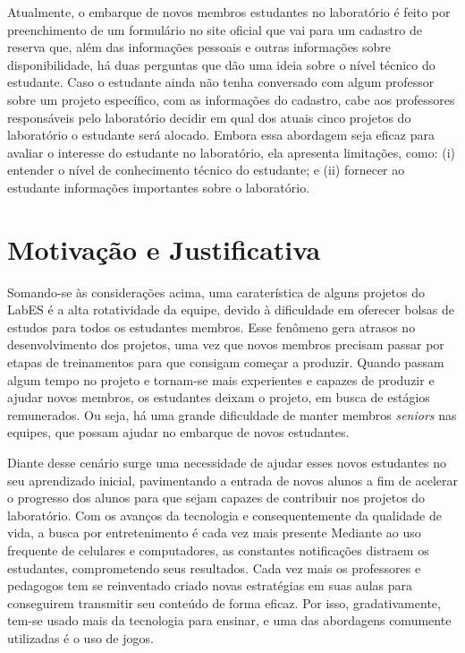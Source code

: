 Atualmente, o embarque de novos membros estudantes no laboratório é feito por preenchimento de um formulário no site oficial que vai para um cadastro de reserva que, além das informações pessoais e outras informações sobre disponibilidade, há duas perguntas que dão uma ideia sobre o nível técnico do estudante. Caso o estudante ainda não tenha conversado com algum professor sobre um projeto específico, com as informações do cadastro, cabe aos professores responsáveis pelo laboratório decidir em qual dos atuais cinco projetos do laboratório o estudante será alocado.  Embora essa abordagem seja eficaz para avaliar o interesse do estudante no laboratório, ela apresenta limitações, como: (i) entender o nível de conhecimento técnico do estudante; e (ii) fornecer ao estudante informações importantes sobre o laboratório.


\section{Motivação e Justificativa}
\label{sec-intro-motjus}
Somando-se às considerações acima, uma caraterística de alguns projetos do LabES é a alta rotatividade da equipe, devido à dificuldade em oferecer bolsas de estudos para todos os estudantes membros. Esse fenômeno gera atrasos no desenvolvimento dos projetos, uma vez que novos membros precisam passar por etapas de treinamentos para que consigam começar a produzir. Quando passam algum tempo no projeto e tornam-se mais experientes e capazes de produzir e ajudar novos membros, os estudantes deixam o projeto, em busca de estágios remunerados. Ou seja, há uma grande dificuldade de manter membros \textit{seniors} nas equipes, que possam ajudar no embarque de novos estudantes. 

Diante desse cenário surge uma necessidade de ajudar esses novos estudantes no seu aprendizado inicial, pavimentando a entrada de novos alunos a fim de acelerar o progresso dos alunos para que sejam capazes de contribuir nos projetos do laboratório.
Com os avanços da tecnologia e consequentemente da qualidade de vida, a busca por entretenimento é cada vez mais presente Mediante ao uso frequente de celulares e computadores, as constantes notificações distraem os estudantes, comprometendo seus resultados. Cada vez mais os professores e pedagogos tem se reinventado criado novas estratégias em suas aulas para conseguirem transmitir seu conteúdo de forma eficaz. Por isso, gradativamente, tem-se usado mais da tecnologia para ensinar, e uma das abordagens comumente utilizadas é o uso de jogos. 

